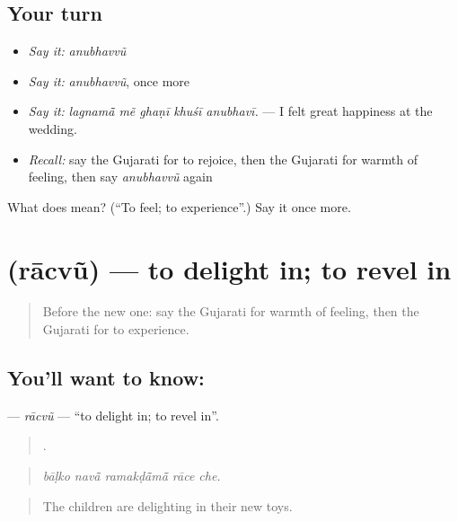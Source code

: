 \subsection*{Your turn}
\begin{itemize}
\raggedright
  \item \emph{Say it:} \emph{anubhavvũ}
  \item \emph{Say it:} \emph{anubhavvũ}, once more
  \item \emph{Say it:} \emph{lagnamā̃ mẽ ghaṇī khuśī anubhavī.} — I felt great happiness at the wedding.
  \item \emph{Recall:} say the Gujarati for to rejoice, then the Gujarati for warmth of feeling, then say \emph{anubhavvũ} again
\end{itemize}

\begin{tcolorbox}[breakable,colback=teal!4,colframe=teal!35!black,title={Before you move on}]
What does  mean? (\textquotedblleft{}To feel; to experience\textquotedblright{}.) Say it once more.
\end{tcolorbox}
\section[\texorpdfstring{\gu{રાચવું} (rācvũ)}{રાચવું (rācvũ)}]{ (rācvũ) — to delight in; to revel in}

\label{lesson:GU-C447-racvu-delight}



\begin{quote}
Before the new one: say the Gujarati for warmth of feeling, then the Gujarati for to experience.
\end{quote}

\subsection*{You'll want to know: }
\textbf{} — \emph{rācvũ} — \textquotedblleft{}to delight in; to revel in\textquotedblright{}.

\begin{quote}
    .
\end{quote}

\begin{quote}
\emph{bāḷko navā̃ ramakḍā̃mā̃ rāce che.}
\end{quote}

\begin{quote}
The children are delighting in their new toys.
\end{quote}

